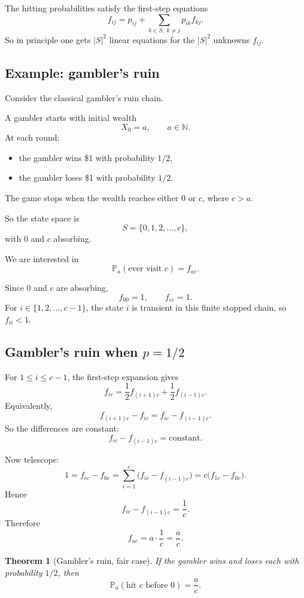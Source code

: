 \documentclass[11pt]{article}
\newtheorem{theorem}{Theorem}[section]
\theoremstyle{definition}
\begin{document}
\begin{keyformula}
The hitting probabilities satisfy the first-step equations
\[
f_{ij}
=
p_{ij}
+
\sum_{k\in S,\;k\neq j} p_{ik}f_{kj}.
\]
So in principle one gets \(|S|^2\) linear equations for the \(|S|^2\) unknowns \(f_{ij}\).
\end{keyformula}

\subsection{Example: gambler's ruin}

Consider the classical gambler's ruin chain.

A gambler starts with initial wealth
\[
X_0=a,
\qquad a\in \mathbb N.
\]
At each round:
\begin{itemize}[leftmargin=2em]
    \item the gambler wins \$1 with probability \(1/2\),
    \item the gambler loses \$1 with probability \(1/2\).
\end{itemize}
The game stops when the wealth reaches either \(0\) or \(c\), where \(c>a\).

So the state space is
\[
S=\{0,1,2,\dots,c\},
\]
with \(0\) and \(c\) absorbing.

We are interested in
\[
\mathbb P_a(\text{ever visit } c)=f_{ac}.
\]

Since \(0\) and \(c\) are absorbing,
\[
f_{00}=1,
\qquad
f_{cc}=1.
\]
For \(i\in\{1,2,\dots,c-1\}\), the state \(i\) is transient in this finite stopped chain, so \(f_{ii}<1\).

\subsection{Gambler's ruin when \texorpdfstring{$p=1/2$}{p=1/2}}

For \(1\le i\le c-1\), the first-step expansion gives
\[
f_{ic}
=
\frac12 f_{(i+1)c}+\frac12 f_{(i-1)c}.
\]
Equivalently,
\[
f_{(i+1)c}-f_{ic}
=
f_{ic}-f_{(i-1)c}.
\]
So the differences are constant:
\[
f_{ic}-f_{(i-1)c}=\text{constant}.
\]

Now telescope:
\[
1
=
f_{cc}-f_{0c}
=
\sum_{i=1}^c \bigl(f_{ic}-f_{(i-1)c}\bigr)
=
c\bigl(f_{1c}-f_{0c}\bigr).
\]
Hence
\[
f_{ic}-f_{(i-1)c}=\frac1c.
\]
Therefore
\[
f_{ac}
=
a\cdot \frac1c
=
\frac{a}{c}.
\]

\begin{theorem}[Gambler's ruin, fair case]
If the gambler wins and loses each with probability \(1/2\), then
\[
\mathbb P_a(\text{hit } c \text{ before } 0)=\frac{a}{c}.
\]
\end{theorem}
\end{document}
